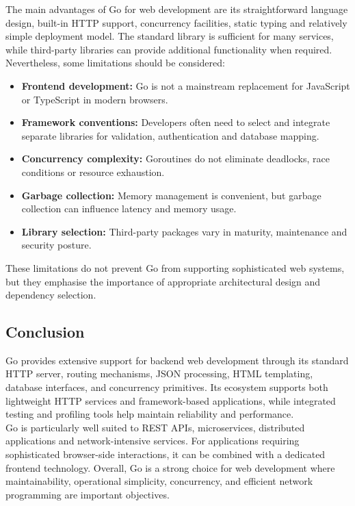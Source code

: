 The main advantages of Go for web development are its straightforward language design, built-in HTTP support, concurrency facilities, static typing and relatively simple deployment model. The standard library is sufficient for many services, while third-party libraries can provide additional functionality when required.\\

Nevertheless, some limitations should be considered:

\begin{itemize}
    \item \textbf{Frontend development:} Go is not a mainstream replacement for JavaScript or TypeScript in modern browsers.
    \item \textbf{Framework conventions:} Developers often need to select and integrate separate libraries for validation, authentication and database mapping.
    \item \textbf{Concurrency complexity:} Goroutines do not eliminate deadlocks, race conditions or resource exhaustion.
    \item \textbf{Garbage collection:} Memory management is convenient, but garbage collection can influence latency and memory usage.
    \item \textbf{Library selection:} Third-party packages vary in maturity, maintenance and security posture.
\end{itemize}

These limitations do not prevent Go from supporting sophisticated web systems, but they emphasise the importance of appropriate architectural design and dependency selection.

\subsection{Conclusion}

Go provides extensive support for backend web development through its standard HTTP server, routing mechanisms, JSON processing, HTML templating, database interfaces, and concurrency primitives. Its ecosystem supports both lightweight HTTP services and framework-based applications, while integrated testing and profiling tools help maintain reliability and performance.\\

Go is particularly well suited to REST APIs, microservices, distributed applications and network-intensive services. For applications requiring sophisticated browser-side interactions, it can be combined with a dedicated frontend technology. Overall, Go is a strong choice for web development where maintainability, operational simplicity, concurrency, and efficient network programming are important objectives.



